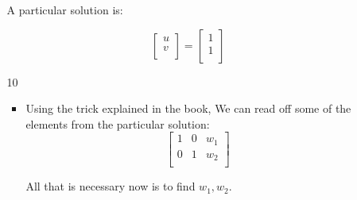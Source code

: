 \documentclass[12pt,letterpaper]{article}
\begin{document}
\begin{enumerate}[label=\S 2.\arabic*]
\begin{enumerate}
          A particular solution is:

          \[
            \begin{bmatrix}
              u \\
              v \\
            \end{bmatrix}
            =
            \begin{bmatrix}
              1 \\
              1 \\
            \end{bmatrix}
          \]
        \item [10]
          \begin{itemize}
            \item
              Using the trick explained in the book,
              We can read off some of the elements from the particular solution:
              \[
                \begin{bmatrix}
                  1 & 0 & w_1 \\
                  0 & 1 & w_2 \\
                \end{bmatrix}
              \]

              All that is necessary now is to find $w_1, w_2$.


\end{itemize}
\end{enumerate}
\end{enumerate}
\end{document}
